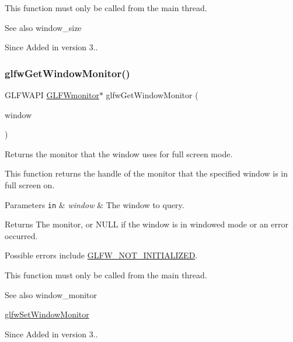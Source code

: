 This function must only be called from the main thread.

\begin{DoxySeeAlso}{See also}
window\+\_\+size
\end{DoxySeeAlso}
\begin{DoxySince}{Since}
Added in version 3.. 
\end{DoxySince}
\mbox{\label{group__window_gaf1525cb3bccd5789c702cc9676ef3403}} 
\subsubsection{\texorpdfstring{glfw\+Get\+Window\+Monitor()}{glfwGetWindowMonitor()}}
{\footnotesize\ttfamily G\+L\+F\+W\+A\+PI \hyperlink{group__monitor_ga8d9efd1cde9426692c73fe40437d0ae3}{G\+L\+F\+Wmonitor}$\ast$ glfw\+Get\+Window\+Monitor (\begin{DoxyParamCaption}\item[{\hyperlink{group__window_ga3c96d80d363e67d13a41b5d1821f3242}{G\+L\+F\+Wwindow} $\ast$}]{window }\end{DoxyParamCaption})}



Returns the monitor that the window uses for full screen mode. 

This function returns the handle of the monitor that the specified window is in full screen on.


\begin{DoxyParams}[1]{Parameters}
\mbox{\tt in}  & {\em window} & The window to query. \\
\hline
\end{DoxyParams}
\begin{DoxyReturn}{Returns}
The monitor, or {\ttfamily N\+U\+LL} if the window is in windowed mode or an error occurred.
\end{DoxyReturn}
Possible errors include \hyperlink{group__errors_ga2374ee02c177f12e1fa76ff3ed15e14a}{G\+L\+F\+W\+\_\+\+N\+O\+T\+\_\+\+I\+N\+I\+T\+I\+A\+L\+I\+Z\+ED}.

This function must only be called from the main thread.

\begin{DoxySeeAlso}{See also}
window\+\_\+monitor 

\hyperlink{group__window_ga12fabf78575e59c00f822f323ae0b6ae}{glfw\+Set\+Window\+Monitor}
\end{DoxySeeAlso}
\begin{DoxySince}{Since}
Added in version 3.. 
\end{DoxySince}
\mbox{\label{group__window_ga0076a8591ef7494d359730cf2250b45b}} 
